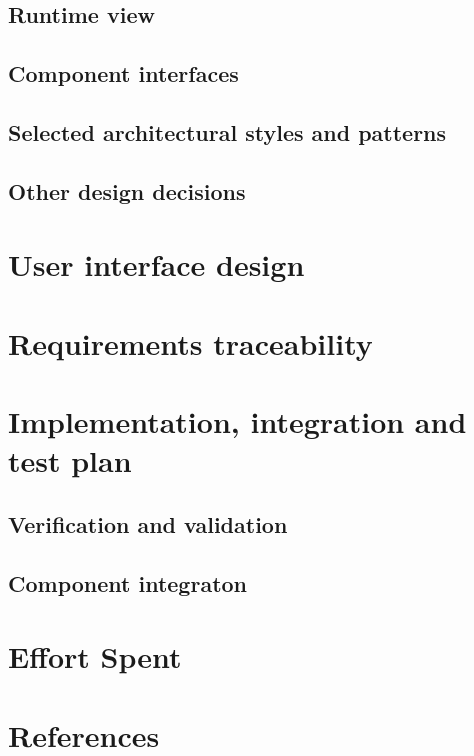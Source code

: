   \section{Runtime view}
  
  \section{Component interfaces}
  
  \section{Selected architectural styles and patterns}
  
  \section{Other design decisions}
  
  
  \chapter{User interface design}
  
  
  \chapter{Requirements traceability}
  
  
  \chapter{Implementation, integration and test plan}
  
  \section{Verification and validation}
  
  \section{Component integraton}
  
  
  \chapter{Effort Spent}
  
  

  \chapter{References}
  
  
  

  \setupspellchecking[state=start]
